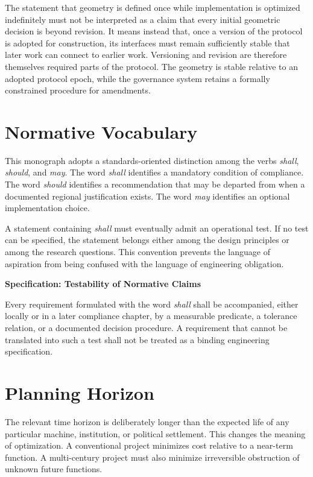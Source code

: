 \documentclass[11pt,fleqn]{book}
\numberwithin{equation}{chapter}
\newenvironment{specification}[1]
  {\begin{specificationEnv}
   \noindent\textbf{Specification: #1}\par\smallskip}
  {\end{specificationEnv}}
\theoremstyle{plain}
\theoremstyle{definition}
\theoremstyle{remark}
\begin{document}
The statement that geometry is defined once while implementation is optimized indefinitely must not be interpreted as a claim that every initial geometric decision is beyond revision. It means instead that, once a version of the protocol is adopted for construction, its interfaces must remain sufficiently stable that later work can connect to earlier work. Versioning and revision are therefore themselves required parts of the protocol. The geometry is stable relative to an adopted protocol epoch, while the governance system retains a formally constrained procedure for amendments.

\section{Normative Vocabulary}

This monograph adopts a standards-oriented distinction among the verbs \emph{shall}, \emph{should}, and \emph{may}. The word \emph{shall} identifies a mandatory condition of compliance. The word \emph{should} identifies a recommendation that may be departed from when a documented regional justification exists. The word \emph{may} identifies an optional implementation choice.

A statement containing \emph{shall} must eventually admit an operational test. If no test can be specified, the statement belongs either among the design principles or among the research questions. This convention prevents the language of aspiration from being confused with the language of engineering obligation.

\begin{specification}{Testability of Normative Claims}
Every requirement formulated with the word \emph{shall} shall be accompanied, either locally or in a later compliance chapter, by a measurable predicate, a tolerance relation, or a documented decision procedure. A requirement that cannot be translated into such a test shall not be treated as a binding engineering specification.
\end{specification}

\section{Planning Horizon}

The relevant time horizon is deliberately longer than the expected life of any particular machine, institution, or political settlement. This changes the meaning of optimization. A conventional project minimizes cost relative to a near-term function. A multi-century project must also minimize irreversible obstruction of unknown future functions.
\end{document}
